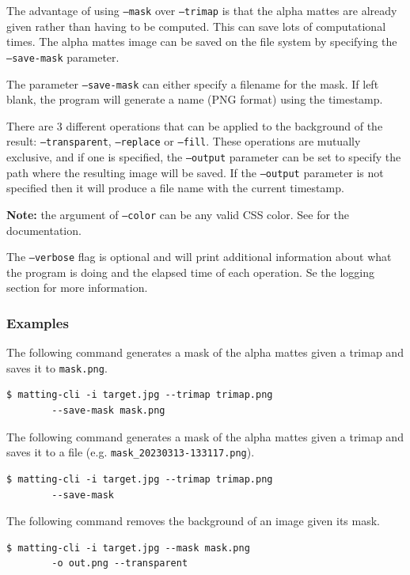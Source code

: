 \documentclass[a4paper]{article}
\begin{document}
The advantage of using \texttt{--mask} over
\texttt{--trimap} is that the alpha mattes are
already given rather than having to be computed.
This can save lots of computational times.
The alpha mattes image can be saved on the file system
by specifying the \texttt{--save-mask} parameter.

The parameter \texttt{--save-mask} can either specify a filename
for the mask. If left blank, the program will generate a name (PNG format)
using the timestamp.

There are 3 different operations that can be applied
to the background of the result: \texttt{--transparent},
\texttt{--replace} or \texttt{--fill}.
These operations are mutually exclusive, and if one is specified,
the \texttt{--output} parameter can be set to
specify the path where the resulting image will be saved.
If the \texttt{--output} parameter is not specified then it will produce
a file name with the current timestamp.

\textbf{Note:} the argument of \texttt{--color} can be any valid
CSS color. See \cite{csscolors} for the documentation.

The \texttt{--verbose} flag is optional and will print additional
information about what the program is doing and the elapsed
time of each operation. Se the logging section for more information.

\subsubsection{Examples}

The following command generates a mask of the alpha mattes
given a trimap and saves it to \texttt{mask.png}.
\begin{lstlisting}[style=boxed]
    $ matting-cli -i target.jpg --trimap trimap.png
        --save-mask mask.png
\end{lstlisting}

The following command generates a mask of the alpha mattes
given a trimap and saves it to a file (e.g. \texttt{mask\_20230313-133117.png}).
\begin{lstlisting}[style=boxed]
    $ matting-cli -i target.jpg --trimap trimap.png
        --save-mask
\end{lstlisting}

The following command removes the background of an image
given its mask.
\begin{lstlisting}[style=boxed]
    $ matting-cli -i target.jpg --mask mask.png
        -o out.png --transparent
\end{lstlisting}
\end{document}
